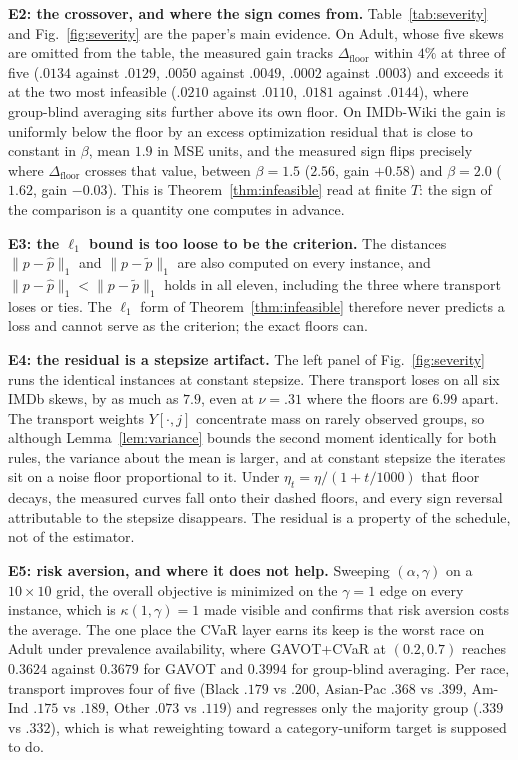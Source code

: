 \documentclass{article}
\theoremstyle{definition}
\newcommand{\avot}{\textsf{GAVOT}}
\newcommand{\avotcvar}{\textsf{GAVOT+CVaR}}
\begin{document}
\noindent\textbf{E2: the crossover, and where the sign comes from.}
Table~\ref{tab:severity} and Fig.~\ref{fig:severity} are the paper's main
evidence. On Adult, whose five skews are omitted from the table, the measured gain tracks
$\Delta_{\mathrm{floor}}$ within $4\%$ at three of five
($.0134$ against $.0129$, $.0050$ against $.0049$, $.0002$ against $.0003$)
and exceeds it at the two most infeasible ($.0210$ against $.0110$, $.0181$
against $.0144$), where group-blind averaging sits further above its own
floor. On IMDb-Wiki the gain is
uniformly below the floor by an excess optimization residual that is close to
constant in $\beta$, mean $1.9$ in MSE units, and the measured sign flips
precisely where $\Delta_{\mathrm{floor}}$ crosses that value, between
$\beta{=}1.5$ ($2.56$, gain $+0.58$) and $\beta{=}2.0$ ($1.62$, gain $-0.03$).
This is Theorem~\ref{thm:infeasible} read at finite $T$: the sign of the
comparison is a quantity one computes in advance.

\noindent\textbf{E3: the $\ell_1$ bound is too loose to be the criterion.}
The distances $\|p-\hat p\|_1$ and $\|p-\tilde p\|_1$ are also computed on every
instance, and $\|p-\hat p\|_1<\|p-\tilde p\|_1$ holds in all eleven, including
the three where transport loses or ties. The $\ell_1$ form of
Theorem~\ref{thm:infeasible} therefore never predicts a loss and cannot serve as
the criterion; the exact floors can.

\noindent\textbf{E4: the residual is a stepsize artifact.}
The left panel of Fig.~\ref{fig:severity} runs the identical instances at
constant stepsize. There transport loses on all six IMDb skews, by as much as
$7.9$, even at $\nu{=}.31$ where the floors are $6.99$ apart. The transport
weights $Y[\cdot,j]$ concentrate mass on rarely observed groups, so although
Lemma~\ref{lem:variance} bounds the second moment identically for both rules,
the variance about the mean is larger, and at constant stepsize the iterates sit
on a noise floor proportional to it. Under $\eta_t=\eta/(1+t/1000)$ that floor
decays, the measured curves fall onto their dashed floors, and every sign
reversal attributable to the stepsize disappears. The residual is a property of
the schedule, not of the estimator.

\noindent\textbf{E5: risk aversion, and where it does not help.}
Sweeping $(\alpha,\gamma)$ on a $10\times10$ grid, the overall objective is
minimized on the $\gamma=1$ edge on every instance, which is
$\kappa(1,\gamma)=1$ made visible and confirms that risk aversion costs the
average. The one place the CVaR layer earns its keep is the worst race on Adult
under prevalence availability, where \avotcvar{} at $(0.2,0.7)$ reaches
$0.3624$ against $0.3679$ for \avot{} and $0.3994$ for group-blind averaging.
Per race, transport improves four of five (Black $.179$ vs $.200$, Asian-Pac
$.368$ vs $.399$, Am-Ind $.175$ vs $.189$, Other $.073$ vs $.119$) and regresses
only the majority group ($.339$ vs $.332$), which is what reweighting toward a
category-uniform target is supposed to do.
\end{document}

